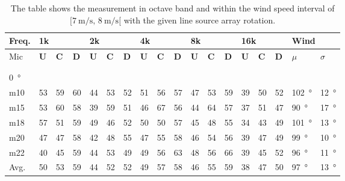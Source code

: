 \begin{table}[H]
\centering
\caption{The table shows the measurement in octave band and within the wind speed interval of $[\SI{7}{\meter\per\second},\, \SI{8}{\meter\per\second}[ $ with the given line source array rotation.}
\setlength\tabcolsep{5pt} %
\begin{tabular}{l|l|l|l|l|l|l|l|l|l|l|l|l|l|l|l|l|l}
Freq. & \multicolumn{3}{l|}{1k} & \multicolumn{3}{l|}{2k} & \multicolumn{3}{l|}{4k} & \multicolumn{3}{l|}{8k} & \multicolumn{3}{l|}{16k}   &  \multicolumn{2}{l}{Wind}                      \\ \hline
Mic  & \textbf{U}      & \textbf{C}      & \textbf{D}     & \textbf{U}      & \textbf{C}      & \textbf{D}    & \textbf{U}      & \textbf{C}      & \textbf{D}     & \textbf{U}      & \textbf{C}      & \textbf{D}     & \textbf{U}  & \textbf{C}  & \textbf{D} & $\mu$ & $\sigma$ \\ \hline
 & \multicolumn{3}{l|}{} & \multicolumn{3}{l|}{} & \multicolumn{3}{l|}{} & \multicolumn{3}{l|}{} & \multicolumn{3}{l|}{} &      \multicolumn{2}{l}{}                        \\ 
 \multicolumn{18}{l}{ } \\  
\SI{0}{\degree}   & \multicolumn{3}{l|}{} & \multicolumn{3}{l|}{} & \multicolumn{3}{l|}{} & \multicolumn{3}{l|}{} & \multicolumn{3}{l|}{} &  \multicolumn{2}{l}{}   \\  \hline
m10  & 53     & 59     & 60    & 44     & 53     & 52    & 51     & 56     & 57    & 47     & 53     & 59    & 39 & 50 & 52 & \SI{102}{\degree} & \SI{12}{\degree}  \\
m15  & 53     & 60     & 58    & 39     & 59     & 51    & 46     & 67     & 56    & 44     & 64     & 57    & 37 & 51 & 47 & \SI{90}{\degree} & \SI{17}{\degree}  \\
m18  & 57     & 51     & 59    & 49     & 46     & 52    & 50     & 50     & 57    & 45     & 48     & 55    & 34 & 43 & 49 & \SI{101}{\degree} & \SI{13}{\degree}  \\
m20  & 47     & 47     & 58    & 42     & 48     & 55    & 47     & 55     & 58    & 46     & 54     & 56    & 39 & 47 & 49 & \SI{99}{\degree} & \SI{10}{\degree}  \\
m22  & 40     & 45     & 59    & 44     & 53     & 49    & 49     & 56     & 63    & 48     & 56     & 66    & 39 & 45 & 52 & \SI{96}{\degree} & \SI{11}{\degree}  \\ \hline
Avg.  &  50     &  53   &  59    &  44    & 52     & 52    &  49    &  57    &  58   &  46    &  55    & 59    & 38   & 47   &  50  & \SI{97}{\degree} & \SI{13}{\degree} \\ \hline  

\end{tabular}
\end{table}
